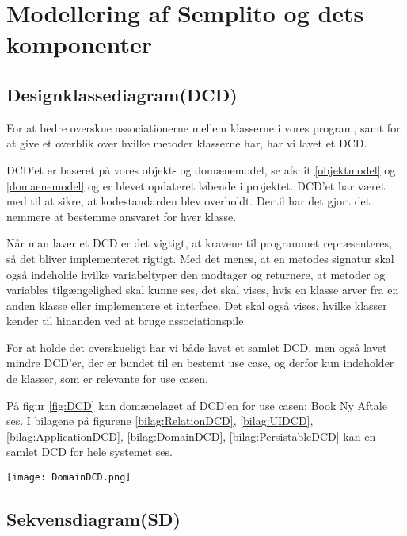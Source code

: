 \section{Modellering af Semplito og dets komponenter}
\label{kabitel:ModelleringSystem}
\subsection{Designklassediagram(DCD)}
\label{DCD}

For at bedre overskue associationerne mellem klasserne i vores program, samt for at give et overblik over hvilke metoder klasserne har, har vi lavet et DCD. 

DCD'et er baseret på vores objekt- og domænemodel, se afsnit \ref{objektmodel} og \ref{domaenemodel} og er blevet opdateret løbende i projektet.
DCD'et har været med til at sikre, at kodestandarden blev overholdt.
Dertil har det gjort det nemmere at bestemme ansvaret for hver klasse.

Når man laver et DCD er det vigtigt, at kravene til programmet repræsenteres, så det bliver implementeret rigtigt.
Med det menes, at en metodes signatur skal også indeholde hvilke variabeltyper den modtager og returnere, at metoder og variables tilgængelighed skal kunne ses, det skal vises, hvis en klasse arver fra en anden klasse eller implementere et interface.
Det skal også vises, hvilke klasser kender til hinanden ved at bruge associationspile.

For at holde det overskueligt har vi både lavet et samlet DCD, men også lavet mindre DCD'er, der er bundet til en bestemt use case, og derfor kun indeholder de klasser, som er relevante for use casen.

På figur \ref{fig:DCD} kan domænelaget af DCD'en for use casen: Book Ny Aftale ses.
I bilagene på figurene \ref{bilag:RelationDCD}, \ref{bilag:UIDCD}, \ref{bilag:ApplicationDCD}, \ref{bilag:DomainDCD}, \ref{bilag:PersistableDCD} kan en samlet DCD for hele systemet ses.


\begin{sidewaysfigure}
    \caption{DCD for Semplito - Bookingsystemet}
    \centering
        \texttt{[image: DomainDCD.png]}
    \label{fig:DCD}
\end{sidewaysfigure}

\subsection{Sekvensdiagram(SD)}
\label{SD}

